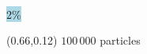 {\begin{textblock}{0.28}
\\
\vspace{1cm}
\colorbox{lightblue}{
2\%}
\end{textblock}

\begin{textblock}{0.28}(0.66,0.12)
\centering
$100\,000$ particles\\[0.1cm]


\end{textblock}}
